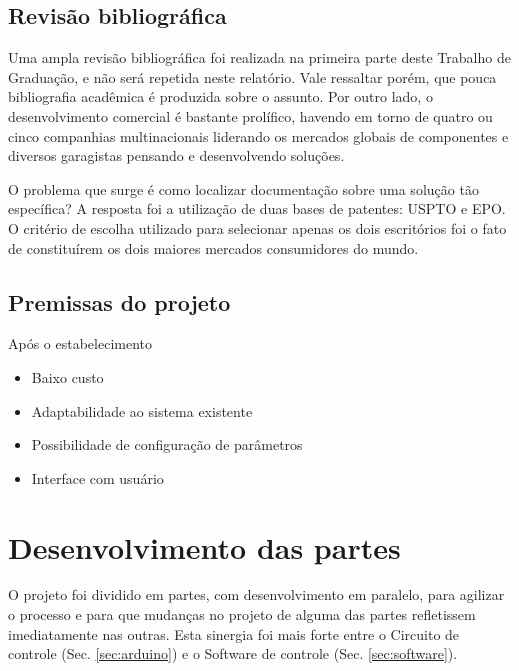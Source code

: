 \documentclass[a4paper,11pt]{article}
\begin{document}
\subsection{Revisão bibliográfica}
Uma ampla revisão bibliográfica foi realizada na primeira parte deste Trabalho
de Graduação, e não será repetida neste relatório. Vale ressaltar porém, que
pouca bibliografia acadêmica é produzida sobre o assunto. Por outro lado, o
desenvolvimento comercial é bastante prolífico, havendo em torno de quatro ou
cinco companhias multinacionais liderando os mercados globais de componentes e
diversos garagistas pensando e desenvolvendo soluções.

O problema que surge é como localizar documentação sobre uma solução tão
específica? A resposta foi a utilização de duas bases de patentes:
USPTO\cite{uspto} e EPO\cite{epo}. O critério de escolha utilizado para
selecionar apenas os dois escritórios foi o fato de constituírem os dois maiores
mercados consumidores do mundo.


\subsection{Premissas do projeto}
Após o estabelecimento 
\begin{itemize}
  \item Baixo custo
  \item Adaptabilidade ao sistema existente
  \item Possibilidade de configuração de parâmetros
  \item Interface com usuário
\end{itemize}



\pagebreak
%
\section{Desenvolvimento das partes}
\label{sec:partes}
O projeto foi dividido em partes, com desenvolvimento em paralelo, para agilizar
o processo e para que mudanças no projeto de alguma das partes refletissem
imediatamente nas outras. Esta sinergia foi mais forte entre o Circuito de
controle (Sec. \ref{sec:arduino}) e o Software de controle (Sec.
\ref{sec:software}).
\end{document}
